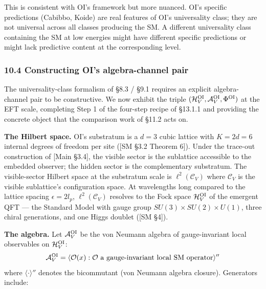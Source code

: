 \documentclass[
]{article}
\begin{document}
This is consistent with OI's framework but more nuanced. OI's specific
predictions (Cabibbo, Koide) are real features of OI's universality
class; they are not universal across all classes producing the SM. A
different universality class containing the SM at low energies might
have different specific predictions or might lack predictive content at
the corresponding level.

\hypertarget{constructing-ois-algebra-channel-pair}{%
\subsubsection{10.4 Constructing OI's algebra-channel
pair}\label{constructing-ois-algebra-channel-pair}}

The universality-class formalism of §8.3 / §9.1 requires an explicit
algebra-channel pair to be constructive. We now exhibit the triple
\((\mathcal{H}_V^{\rm OI}, \mathcal{A}_V^{\rm OI}, \Phi^{\rm OI})\) at
the EFT scale, completing Step 1 of the four-step recipe of §13.1.1 and
providing the concrete object that the comparison work of §11.2 acts on.

\textbf{The Hilbert space.} OI's substratum is a \(d = 3\) cubic lattice
with \(K = 2d = 6\) internal degrees of freedom per site ({[}SM §3.2
Theorem 6{]}). Under the trace-out construction of {[}Main §3.4{]}, the
visible sector is the sublattice accessible to the embedded observer;
the hidden sector is the complementary substratum. The visible-sector
Hilbert space at the substratum scale is \(\ell^2(\mathcal{C}_V)\) where
\(\mathcal{C}_V\) is the visible sublattice's configuration space. At
wavelengths long compared to the lattice spacing \(\epsilon = 2 l_p\),
\(\ell^2(\mathcal{C}_V)\) resolves to the Fock space
\(\mathcal{H}_V^{\rm OI}\) of the emergent QFT --- the Standard Model
with gauge group \(SU(3) \times SU(2) \times U(1)\), three chiral
generations, and one Higgs doublet ({[}SM §4{]}).

\textbf{The algebra.} Let \(\mathcal{A}_V^{\rm OI}\) be the von Neumann
algebra of gauge-invariant local observables on
\(\mathcal{H}_V^{\rm OI}\):
\[\mathcal{A}_V^{\rm OI} = \langle \mathcal{O}(x) : \mathcal{O} \text{ a gauge-invariant local SM operator}\rangle''\]
where \(\langle \cdot \rangle''\) denotes the bicommutant (von Neumann
algebra closure). Generators include:
\end{document}
